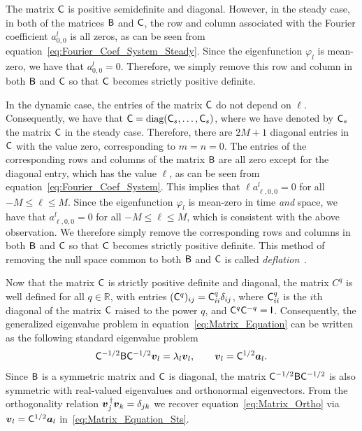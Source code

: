 \documentclass[amsa]{ipart}
\begin{document}
The matrix $\mathsf{C}$ is positive semidefinite and diagonal. However, in
the steady case, in both of the matrices $\mathsf{B}$ and $\mathsf{C}$, the row
and column associated with the Fourier coefficient $a^l_{0,0}$ is all
zeros, as can be seen
from equation~\eqref{eq:Fourier_Coef_System_Steady}. Since the
eigenfunction $\varphi_l$ is mean-zero, we have that
$a^l_{0,0}=0$. Therefore, we simply remove 
this row and column in both $\mathsf{B}$ and $\mathsf{C}$ so that $\mathsf{C}$ becomes
strictly positive definite.


In the dynamic case, the entries of the
matrix $\mathsf{C}$ do not depend on $\ell$. Consequently, we have that
$\mathsf{C}=\text{diag}(\mathsf{C}_s,\ldots,\mathsf{C}_s)$, where we have denoted by $\mathsf{C}_s$ the matrix
$\mathsf{C}$ in the steady case. Therefore, there are $2M+1$ diagonal entries
in $\mathsf{C}$ with the value zero, corresponding to $m=n=0$. The entries of
the corresponding rows and columns of the matrix $\mathsf{B}$ are all zero
except for the diagonal entry, which has the value $\ell$, as can be seen
from equation~\eqref{eq:Fourier_Coef_System}. This implies that
$\ell a^l_{\ell,0,0}=0$ for all $-M\leq\ell\leq M$. Since the eigenfunction $\varphi_l$ is
mean-zero in time \emph{and} space, we have that $a^l_{\ell,0,0}=0$ for
all $-M\leq\ell\leq M$, which is consistent with the above observation. We
therefore simply remove the corresponding rows and columns in both
$\mathsf{B}$ and $\mathsf{C}$ so that $\mathsf{C}$ becomes strictly positive definite. This
method of removing the null space common to both $\mathsf{B}$ and $\mathsf{C}$ is
called \emph{deflation}~\cite{Parlett:1980}.



Now that the matrix $\mathsf{C}$ is strictly positive definite and diagonal,
the matrix $C^q$ is well defined for all $q\in\mathbb{R}$, with entries
$(\mathsf{C}^q)_{ij}=\mathsf{C}_{ii}^q \delta_{ij}$, where $\mathsf{C}_{ii}^q$ is the $i$th
diagonal of the matrix $\mathsf{C}$ raised to the power $q$, and
$\mathsf{C}^q\mathsf{C}^{-q}=\mathsf{I}$. Consequently, 
the generalized eigenvalue problem in
equation~\eqref{eq:Matrix_Equation} can be written as the following
standard eigenvalue problem
%
\begin{align}\label{eq:Matrix_Equation_Sts}
  \Cm^{-1/2}\Bm\Cm^{-1/2}\vecv_l=\lambda_l\vecv_l,
  \qquad
  \vecv_l=\Cm^{1/2}\veca_l.
\end{align}
%
Since $\mathsf{B}$ is a symmetric matrix and $\mathsf{C}$ is diagonal, the matrix
$\mathsf{C}^{-1/2}\mathsf{B}\mathsf{C}^{-1/2}$ is also symmetric with real-valued
eigenvalues and orthonormal eigenvectors. From the
orthogonality relation $\boldsymbol{v}_j^{\,\dagger}\boldsymbol{v}_k=\delta_{jk}$ we recover
equation~\eqref{eq:Matrix_Ortho} via $\boldsymbol{v}_l=\mathsf{C}^{1/2}\boldsymbol{a}_l$
in~\eqref{eq:Matrix_Equation_Sts}. 
\end{document}
